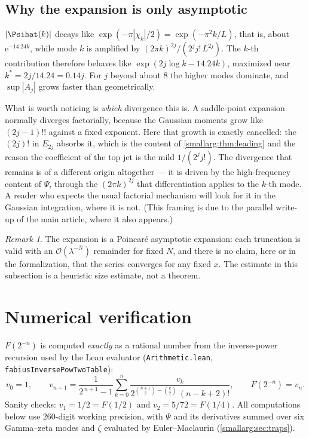 \documentclass[11pt,oneside]{article}
\theoremstyle{definition}
\theoremstyle{remark}
\newtheorem{remark}[theorem]{Remark}
\newcommand{\e}{\mathrm e}
\newcommand{\bigO}{\mathcal O}
\begin{document}
\subsection{Why the expansion is only asymptotic}

$|\Psihat(k)|$ decays like $\exp(-\pi|\chi_k|/2)=\exp(-\pi^2k/L)$, that is,
about $\e^{-14.24k}$, while mode $k$ is amplified by
$(2\pi k)^{2j}/(2^jj!\,L^{2j})$.  The $k$-th contribution therefore behaves like
$\exp(2j\log k-14.24k)$, maximized near $k^\ast=2j/14.24=0.14j$.  For $j$ beyond
about $8$ the higher modes dominate, and $\sup|A_j|$ grows faster than
geometrically.

What is worth noticing is \emph{which} divergence this is.  A saddle-point
expansion normally diverges factorially, because the Gaussian moments grow
like $(2j-1)!!$ against a fixed exponent.  Here that growth is exactly
cancelled: the $(2j)!$ in $E_{2j}$ absorbs it, which is the content of
\cref{smallarg:thm:leading} and the reason the coefficient of the top jet is the mild
$1/(2^jj!)$.  The divergence that remains is of a different origin
altogether --- it is driven by the high-frequency content of $\Psi$, through
the $(2\pi k)^{2j}$ that differentiation applies to the $k$-th mode.  A
reader who expects the usual factorial mechanism will look for it in the
Gaussian integration, where it is not.  (This framing is due to the parallel
write-up of the main article, where it also appears.)

\begin{remark}
The expansion is a Poincar\'e asymptotic expansion: each truncation is valid
with an $\bigO(\lambda^{-N})$ remainder for fixed $N$, and there is no claim,
here or in the formalization, that the series converges for any fixed $x$.
The estimate in this subsection is a heuristic size estimate, not a theorem.
\end{remark}

\section{Numerical verification}\label{smallarg:sec:numerics}

$F(2^{-n})$ is computed \emph{exactly} as a rational number from the
inverse-power recursion used by the Lean evaluator
(\nolinkurl{Arithmetic.lean}, \lstinline[style=pseudo]{fabiusInversePowTwoTable}):
\[
  v_0=1,\qquad
  v_{n+1}=\frac{1}{2^{\,n+1}-1}
    \sum_{k=0}^{n}\frac{v_k}{2^{\binom{n+1}{2}-\binom{k}{2}}\,(n-k+2)!},
  \qquad F(2^{-n})=v_n.
\]
Sanity checks: $v_1=1/2=F(1/2)$ and $v_2=5/72=F(1/4)$.  All computations below
use $260$-digit working precision, with $\Psi$ and its derivatives summed over
six Gamma--zeta modes and $\zeta$ evaluated by Euler--Maclaurin
(\cref{smallarg:sec:traps}).
\end{document}
